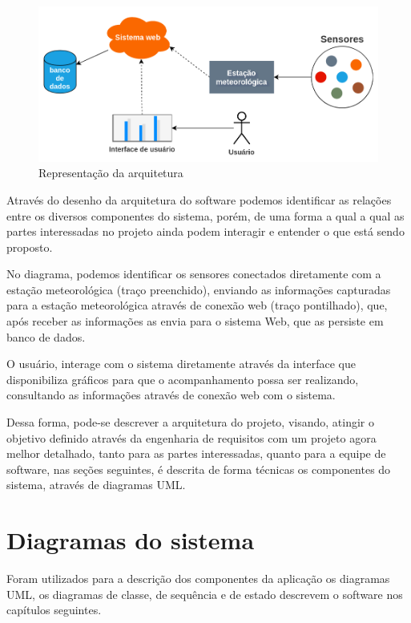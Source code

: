 \begin{center}
\begin{figure}[H]
    \centering
    \caption{Representação da arquitetura} \label{fig:figure_arq_macro}
    \includegraphics[scale=0.47]{diagrams/arq_macro.png}
    \hfill
{}
\end{figure}
\end{center}

Através do desenho da arquitetura do software podemos identificar as relações entre os diversos componentes do sistema, porém, de uma forma a qual a qual as partes interessadas no projeto ainda podem interagir e entender o que está sendo proposto.

No diagrama, podemos identificar os sensores conectados diretamente com a estação meteorológica (traço preenchido), enviando as informações capturadas para a estação meteorológica através de conexão web (traço pontilhado), que, após receber as informações as envia para o sistema Web, que as persiste em banco de dados.

O usuário, interage com o sistema diretamente através da interface que disponibiliza gráficos para que o acompanhamento possa ser realizando, consultando as informações através de conexão web com o sistema.

Dessa forma, pode-se descrever a arquitetura do projeto, visando, atingir o objetivo definido através da engenharia de requisitos com um projeto agora melhor detalhado, tanto para as partes interessadas, quanto para a equipe de software, nas seções seguintes, é descrita de forma técnicas os componentes do sistema, através de diagramas UML.

\section{Diagramas do sistema}

Foram utilizados para a descrição dos componentes da aplicação os diagramas UML, os diagramas de classe, de sequência e de estado descrevem o software nos capítulos seguintes.

